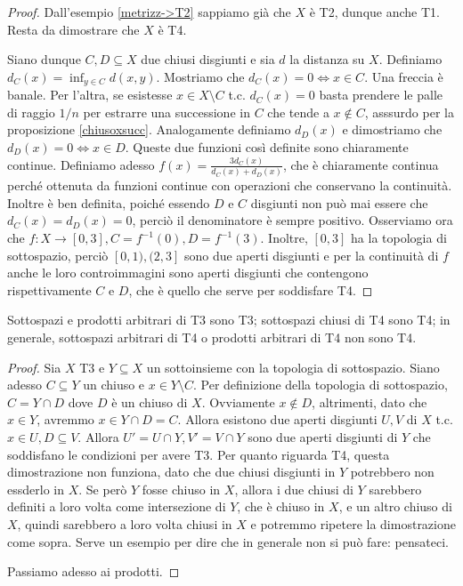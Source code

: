 \begin{proof}
  Dall'esempio \ref{metrizz->T2} sappiamo già che $X$ è T2, dunque anche T1. Resta da dimostrare che $X$ è T4.

  Siano dunque $C, D \subseteq X$ due chiusi disgiunti e sia $d$ la distanza su $X$. Definiamo $d_C(x)=\inf_{y \in C} d(x, y)$. Mostriamo che $d_C(x)=0 \Leftrightarrow x \in C$. Una freccia è banale. Per l'altra, se esistesse $x \in X \setminus C$ t.c. $d_C(x)=0$ basta prendere le palle di raggio $1/n$ per estrarre una successione in $C$ che tende a $ x \not\in C$, asssurdo per la proposizione \ref{chiusoxsucc}. Analogamente definiamo $d_D(x)$ e
  dimostriamo che $d_D(x)=0 \Leftrightarrow x \in D$. Queste due funzioni così definite sono chiaramente continue. Definiamo adesso $\displaystyle f(x)=\frac{3d_C(x)}{d_C(x)+d_D(x)}$, che è chiaramente continua perché ottenuta da funzioni continue con operazioni che conservano la continuità. Inoltre è ben definita, poiché essendo $D$ e $C$ disgiunti non può mai essere che $d_C(x)=d_D(x)=0$, perciò il denominatore è sempre positivo. Osserviamo ora che $f:X \rightarrow [0, 3], C=f^{-1}(0), D=f^{-1}(3)$. Inoltre, $[0, 3]$ ha la topologia di sottospazio, perciò $[0, 1), (2, 3]$ sono due aperti disgiunti e per la continuità di $f$ anche le loro controimmagini sono aperti disgiunti che contengono rispettivamente $C$ e $D$, che è quello che serve per soddisfare T4.
\end{proof}

\begin{prop}
  Sottospazi e prodotti arbitrari di T3 sono T3; sottospazi chiusi di T4 sono T4; in generale, sottospazi arbitrari di T4 o prodotti arbitrari di T4 non sono T4.
\end{prop}

\begin{proof}
  Sia $X$ T3 e $Y \subseteq X$ un sottoinsieme con la topologia di sottospazio. Siano adesso $C \subseteq Y$ un chiuso e $x \in Y \setminus C$. Per definizione della topologia di sottospazio, $C=Y \cap D$ dove $D$ è un chiuso di $X$. Ovviamente $x \not\in D$, altrimenti, dato che $x \in Y$, avremmo $x \in Y \cap D=C$. Allora esistono due aperti disgiunti $U, V$ di $X$ t.c. $x \in U, D \subseteq V$. Allora $U'=U \cap Y, V'=V \cap Y$ sono due aperti
  disgiunti di $Y$ che soddisfano le condizioni per avere T3. Per quanto riguarda T4, questa dimostrazione non funziona, dato che due chiusi disgiunti in $Y$ potrebbero non essderlo in $X$. Se però $Y$ fosse chiuso in $X$, allora i due chiusi di $Y$ sarebbero definiti a loro volta come intersezione di $Y$, che è chiuso in $X$, e un altro chiuso di $X$, quindi sarebbero a loro volta chiusi in $X$ e potremmo ripetere la dimostrazione come sopra. Serve un esempio per dire che in generale non si può fare: pensateci.

  Passiamo adesso ai prodotti.
\end{proof}

